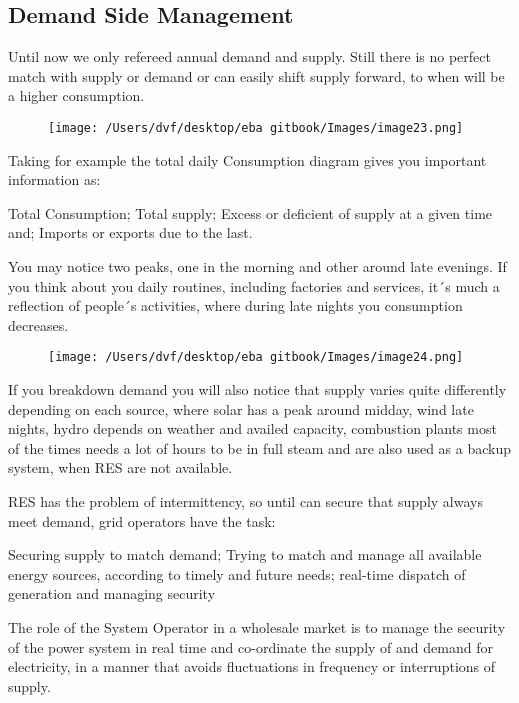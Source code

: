 \documentclass[]{book}
\theoremstyle{definition}
\theoremstyle{definition}
\theoremstyle{definition}
\theoremstyle{remark}
\begin{document}
\subsection{Demand Side Management}\label{demand-side-management}

Until now we only refereed annual demand and supply. Still there is no
perfect match with supply or demand or can easily shift supply forward,
to when will be a higher consumption.

\begin{figure}[htbp]
\centering
\texttt{[image: /Users/dvf/desktop/eba gitbook/Images/image23.png]}
\caption{}
\end{figure}

Taking for example the total daily Consumption diagram gives you
important information as:

Total Consumption; Total supply; Excess or deficient of supply at a
given time and; Imports or exports due to the last.

You may notice two peaks, one in the morning and other around late
evenings. If you think about you daily routines, including factories and
services, it´s much a reflection of people´s activities, where during
late nights you consumption decreases.

\begin{figure}[htbp]
\centering
\texttt{[image: /Users/dvf/desktop/eba gitbook/Images/image24.png]}
\caption{}
\end{figure}

If you breakdown demand you will also notice that supply varies quite
differently depending on each source, where solar has a peak around
midday, wind late nights, hydro depends on weather and availed capacity,
combustion plants most of the times needs a lot of hours to be in full
steam and are also used as a backup system, when RES are not available.

RES has the problem of intermittency, so until can secure that supply
always meet demand, grid operators have the task:

Securing supply to match demand; Trying to match and manage all
available energy sources, according to timely and future needs;
real-time dispatch of generation and managing security

The role of the System Operator in a wholesale market is to manage the
security of the power system in real time and co-ordinate the supply of
and demand for electricity, in a manner that avoids fluctuations in
frequency or interruptions of supply.
\end{document}
